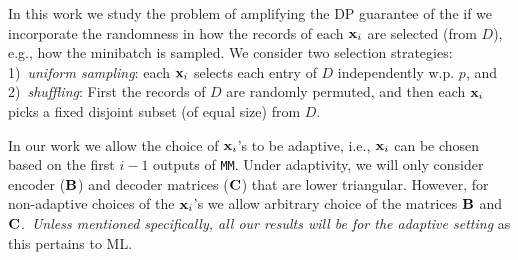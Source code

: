  In this work we study the problem of amplifying the DP guarantee of the \mm if we incorporate the randomness in how the records of each $\mathbf{x}_i$ are selected (from $D$), e.g., how the minibatch is sampled.
We consider two selection strategies: 1)~\emph{uniform sampling}: each $\mathbf{x}_i$ selects each entry of $D$ independently w.p. $p$, and 2)~\emph{shuffling}: First the records of $D$ are randomly permuted, and then each $\mathbf{x}_i$ picks a fixed disjoint subset (of equal size) from $D$.

 In our work we allow the choice of $\mathbf{x}_i$'s to be adaptive, i.e., $\mathbf{x}_i$ can be chosen based on the first $i-1$ outputs of \texttt{MM}. Under adaptivity, we will only consider encoder ($\mathbf{B}$) and decoder matrices ($\mathbf{C}$) that are lower triangular. However, for non-adaptive choices of the $\mathbf{x}_i$'s we  allow arbitrary choice of the matrices $\mathbf{B}$ and $\mathbf{C}$.~\emph{Unless mentioned specifically, all our results will be for the adaptive setting} as this pertains to ML.
